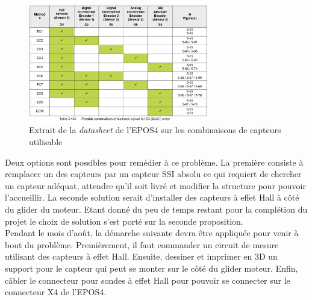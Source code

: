 \begin{figure}[H]
    \centering
    \includegraphics[width = 0.7\textwidth]{assets/figures/TableauCapteur.png}
    \caption{Extrait de la \textit{datasheet} de l'EPOS4 sur les combinaisons de capteurs utilisable}
    \label{fig:TableauCapteur}
\end{figure}

Deux options sont possibles pour remédier à ce problème. La première consiste à remplacer un des capteurs par un capteur SSI absolu ce qui
requiert de chercher un capteur adéquat, attendre qu'il soit livré et modifier la structure pour pouvoir l'accueillir. La seconde solution
serait d'installer des capteurs à effet Hall à côté du glider du moteur. Etant donné du peu de temps restant pour la complétion du projet le
choix de solution s'est porté sur la seconde proposition.\\

Pendant le mois d'août, la démarche suivante devra être appliquée pour venir à bout du problème. Premièrement, il faut commander un circuit de
mesure utilisant des capteurs à effet Hall. Ensuite, dessiner et imprimer en 3D un support pour le capteur qui peut se monter sur le côté du
glider moteur. Enfin, câbler le connecteur pour sondes à effet Hall pour pouvoir se connecter sur le connecteur X4 de l'EPOS4.
